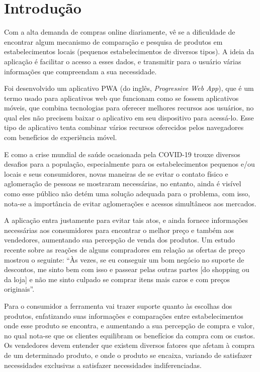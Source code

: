 \section{Introdução}

Com a alta demanda de compras online diariamente, vê se a dificuldade de encontrar algum mecanismo de comparação e pesquisa de produtos em estabelecimentos locais (pequenos estabelecimentos de diversos tipos). A ideia da aplicação é facilitar o acesso a esses dados, e transmitir para o usuário várias informações que compreendam a sua necessidade.

Foi desenvolvido um aplicativo PWA (do inglês, \textit{Progressive Web App}), que é um termo usado para aplicativos web que funcionam como se fossem aplicativos móveis, que combina tecnologias para oferecer melhores recursos aos usuários, no qual eles não precisem baixar o aplicativo em seu dispositivo para acessá-lo. Esse tipo de aplicativo tenta combinar vários recursos oferecidos pelos navegadores com benefícios de experiência móvel. {\cite{souza2017pwa}}

E como a crise mundial de saúde ocasionada pela COVID-19 trouxe diversos desafios para a população, especialmente para os estabelecimentos pequenos e/ou locais e seus consumidores, novas maneiras de se evitar o contato físico e aglomeração de pessoas se mostraram necessárias, no entanto, ainda é visível como esse público não detém uma solução adequada para o problema, com isso, nota-se a importância de evitar aglomerações e acessos simultâneos aos mercados.

A aplicação entra justamente para evitar tais atos, e ainda fornece informações necessárias aos consumidores para encontrar o melhor preço e também aos vendedores, aumentando sua percepção de venda dos produtos. Um estudo recente sobre as reações de alguns compradores em relação as ofertas de preço mostrou o seguinte: ``Às vezes, se eu conseguir um bom negócio no suporte de descontos, me sinto bem com isso e passear pelas outras partes [do shopping ou da loja] e não me sinto culpado se comprar itens mais caros e com preços originais''.{\cite{grewal1998effects}} 

Para o consumidor a ferramenta vai trazer suporte quanto às escolhas dos produtos, enfatizando suas informações e comparações entre estabelecimentos onde esse produto se encontra, e aumentando a sua percepção de compra e valor, no qual nota-se que os clientes equilibram os benefícios da compra com os custos{\cite{grewal1998effects}}. Os vendedores devem entender que existem diversos fatores que afetam à compra de um determinado produto, e onde o produto se encaixa, variando de satisfazer necessidades exclusivas a satisfazer necessidades indiferenciadas.{\cite{grewal1998effects}}



